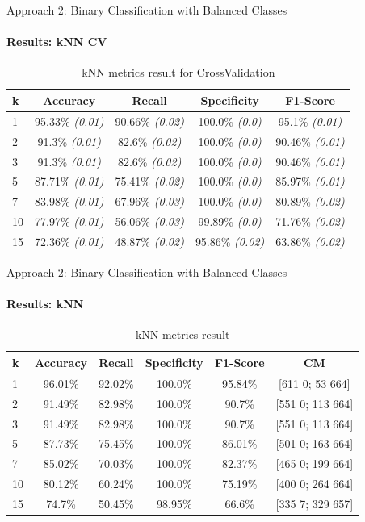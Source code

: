 \documentclass[9pt, pstricks, xcolor=dvipsnames]{beamer}
\begin{document}
\begin{frame}{Approach 2: Binary Classification
with Balanced Classes}
\framesubtitle{Results: kNN CV}
\begin{table}[H]
    \centering
    \begin{tabular}{lcccc}
        \toprule
        k          & Accuracy                & Recall                   & Specificity               & F1-Score  \\
        \midrule
        1 & 95.33\% \textit{(0.01)} & 90.66\% \textit{(0.02)} & 100.0\% \textit{(0.0)} & 95.1\% \textit{(0.01)} \\
        2 & 91.3\% \textit{(0.01)} & 82.6\% \textit{(0.02)} & 100.0\% \textit{(0.0)} & 90.46\% \textit{(0.01)} \\
        3 & 91.3\% \textit{(0.01)} & 82.6\% \textit{(0.02)} & 100.0\% \textit{(0.0)} & 90.46\% \textit{(0.01)} \\
        5 & 87.71\% \textit{(0.01)} & 75.41\% \textit{(0.02)} & 100.0\% \textit{(0.0)} & 85.97\% \textit{(0.01)} \\
        7 & 83.98\% \textit{(0.01)} & 67.96\% \textit{(0.03)} & 100.0\% \textit{(0.0)} & 80.89\% \textit{(0.02)} \\
        10 & 77.97\% \textit{(0.01)} & 56.06\% \textit{(0.03)} & 99.89\% \textit{(0.0)} & 71.76\% \textit{(0.02)} \\
        15 & 72.36\% \textit{(0.01)} & 48.87\% \textit{(0.02)} & 95.86\% \textit{(0.02)} & 63.86\% \textit{(0.02)} \\
        \bottomrule
    \end{tabular}
    \caption{kNN metrics result for CrossValidation}
    \label{tab:kNN_CV_approach2}
\end{table}
\end{frame}
\begin{frame}{Approach 2: Binary Classification
with Balanced Classes}
\framesubtitle{Results: kNN}
\begin{table}[H]
    \centering
    \begin{tabular}{lccccc}
        \toprule
        k & Accuracy & Recall & Specificity & F1-Score & CM \\
        \midrule
        1 & 96.01\%  & 92.02\%  & 100.0\%  & 95.84\% & [611 0; 53 664] \\
        2 & 91.49\%  & 82.98\%  & 100.0\%  & 90.7\% & [551 0; 113 664] \\
        3 & 91.49\%  & 82.98\%  & 100.0\%  & 90.7\% & [551 0; 113 664] \\
        5 & 87.73\%  & 75.45\%  & 100.0\%  & 86.01\% & [501 0; 163 664] \\
        7 & 85.02\%  & 70.03\%  & 100.0\%  & 82.37\% & [465 0; 199 664] \\
        10 & 80.12\%  & 60.24\%  & 100.0\%  & 75.19\% & [400 0; 264 664] \\
        15 & 74.7\%  & 50.45\%  & 98.95\%  & 66.6\% & [335 7; 329 657] \\
        \bottomrule
    \end{tabular}
    \caption{kNN metrics result}
    \label{tab:kNN_approach2}
\end{table}
\end{frame}
\end{document}
